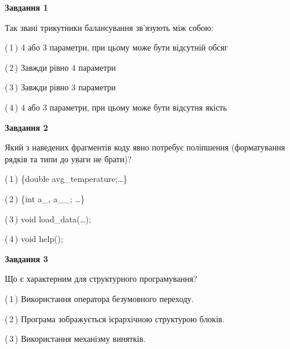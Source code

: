 \documentclass[10pt, ukrainian]{article}
\begin{document}
{
\begin {large}
{\begin {center}\textbf{Завдання 1}\end {center}}\par
Так звані трикутники балансування зв'язують між собою:\par
\vspace{2mm}



(\,1\,) 4 або 3 параметри, при цьому може бути відсутній обсяг %



(\,2\,) Завжди рівно 4 параметри%



(\,3\,) Завжди рівно 3 параметри%



(\,4\,) 4 або 3 параметри, при цьому може бути відсутня якість%


{\begin {center}\textbf{Завдання 2}\end {center}}\par
Який з наведених фрагментів коду явно потребує поліпшення (форматування рядків та типи до уваги не брати)?\par
\vspace{2mm}



(\,1\,) \{double avg\_temperature;…\} %



(\,2\,) \{int a\_, a\_\_; …\}%



(\,3\,) void load\_data(…);%



(\,4\,) void help();%


{\begin {center}\textbf{Завдання 3}\end {center}}\par
Що є характерним для структурного програмування?\par
\vspace{2mm}



(\,1\,) Використання оператора безумовного переходу. %



(\,2\,) Програма зображується ієрархічною структурою блоків.%



(\,3\,) Використання механізму винятків. %




\end{large}}
\end{document}
